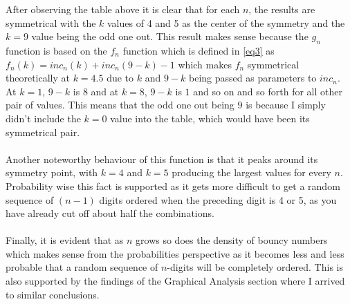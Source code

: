 \documentclass[titlepage,12pt]{article}
\begin{document}
\noindent
After observing the table above it is clear that for each $n$, the results are symmetrical with the $k$ values of 4 and 5 as the center of the symmetry and the $k=9$ value being the odd one out. This result makes sense because the $g_n$ function is based on the $f_n$ function which is defined in \ref{eq3} as $f_n(k) = inc_n(k) + inc_n(9-k) - 1$ which makes $f_n$ symmetrical theoretically at $k=4.5$ due to $k$ and $9-k$ being passed as parameters to $inc_n$. At $k=1$, $9-k$ is $8$ and at $k=8$, $9-k$ is $1$ and so on and so forth for all other pair of values. This means that the odd one out being $9$ is because I simply didn't include the $k=0$ value into the table, which would have been its symmetrical pair.\\\\
\noindent
Another noteworthy behaviour of this function is that it peaks around its symmetry point, with $k=4$ and $k=5$ producing the largest values for every $n$. Probability wise this fact is supported as it gets more difficult to get a random sequence of $(n-1)$ digits ordered when the preceding digit is 4 or 5, as you have already cut off about half the combinations.\\\\
\noindent
Finally, it is evident that as $n$ grows so does the density of bouncy numbers which makes sense from the probabilities perspective as it becomes less and less probable that a random sequence of $n$-digits will be completely ordered. This is also supported by the findings of the Graphical Analysis section where I arrived to similar conclusions.
\end{document}
